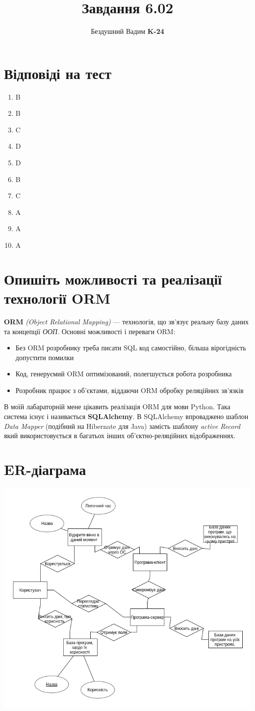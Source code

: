 \documentclass[a4paper, 12pt]{article}
\title{Завдання 6.02}
\author{Бездушний Вадим \textbf{K-24}}
\date{}
\begin{document}
\maketitle

\section{Відповіді на тест}
\begin{enumerate}
\item{B}
\item{B}
\item{C}
\item{D}
\item{D}
\item{B}
\item{C}
\item{A}
\item{A}
\item{A}
\end{enumerate}
\section{Опишіть можливості та реалізації технології ORM}
\textbf{ORM} \textit{(Object Relational Mapping)} --- технологія, що зв’язує реальну базу даних та концепції \textit{ООП}.
Основні можливості і переваги ORM:
\begin{itemize}
\item{Без ORM розробнику треба писати SQL код самостійно, більша вірогідність допустити помилки}
\item{Код, генеруємий ORM оптимізований, полегшується робота розробника}
\item{Розробник працює з об’єктами, віддаючи ORM обробку реляційних зв’язків}
\end{itemize}
В моїй лабараторній мене цікавить реалізація ORM для мови Python. Така система існує і називається \textbf{SQLAlchemy}. В SQLAlchemy впроваджено шаблон \textit{Data Mapper} (подібний на Hibernate для Java) замість шаблону \textit{active Record} який використовується в багатьох інших об'єктно-реляційних відображеннях.
\section{ER-діаграма}
\includegraphics[width=\textwidth]{erdiagram.png}
\end{document}
